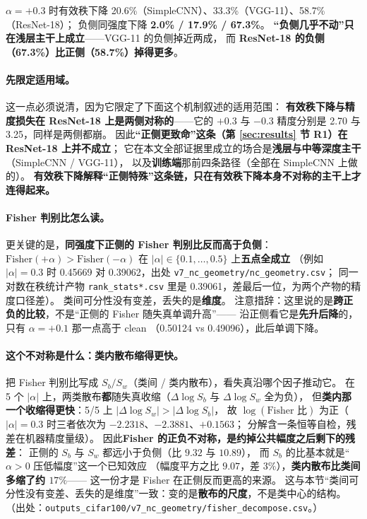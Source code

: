 \documentclass[11pt,a4paper]{ctexart}
\begin{document}
$\alpha=+0.3$ 时有效秩下降 20.6\%（SimpleCNN）、33.3\%（VGG-11）、58.7\%（ResNet-18）；
负侧同强度下降 \textbf{2.0\% / 17.9\% / 67.3\%}。
\textbf{“负侧几乎不动”只在浅层主干上成立}——VGG-11 的负侧掉近两成，
而 \textbf{ResNet-18 的负侧（67.3\%）比正侧（58.7\%）掉得更多}。

\paragraph{先限定适用域。}
这一点必须说清，因为它限定了下面这个机制叙述的适用范围：
\textbf{有效秩下降与精度损失在 ResNet-18 上是两侧对称的}——它的 $+0.3$ 与 $-0.3$ 精度分别是
2.70 与 3.25，同样是两侧都崩。
因此\textbf{“正侧更致命”这条（第 \ref{sec:results} 节 R1）在 ResNet-18 上并不成立}；
它在本文全部证据里成立的场合是\textbf{浅层与中等深度主干}（SimpleCNN / VGG-11），
以及\textbf{训练端}那前四条路径（全部在 SimpleCNN 上做的）。
\textbf{有效秩下降解释“正侧特殊”这条链，只在有效秩下降本身不对称的主干上才连得起来。}

\paragraph{Fisher 判别比怎么读。}
更关键的是，\textbf{同强度下正侧的 Fisher 判别比反而高于负侧}：
$\text{Fisher}(+\alpha)>\text{Fisher}(-\alpha)$ 在 $|\alpha|\in\{0.1,\dots,0.5\}$ 上\textbf{五点全成立}
（例如 $|\alpha|=0.3$ 时 0.45669 对 0.39062，出处 \texttt{v7\_nc\_geometry/nc\_geometry.csv}；
同一对数在秩统计产物 \texttt{rank\_stats*.csv} 里是 0.39061，差最后一位，为两个产物的精度口径差）。
类间可分性没有变差，丢失的是\textbf{维度}。
注意措辞：这里说的是\textbf{跨正负的比较}，不是“正侧的 Fisher 随失真单调升高”——
沿正侧看它是\textbf{先升后降}的，只有 $\alpha=+0.1$ 那一点高于 clean
（0.50124 vs 0.49096），此后单调下降。

\paragraph{这个不对称是什么：类内散布缩得更快。}
把 Fisher 判别比写成 $S_b/S_w$（类间 / 类内散布），看失真沿哪个因子推动它。
在 5 个 $|\alpha|$ 上，两类散布\textbf{都}随失真收缩（$\Delta\log S_b$ 与 $\Delta\log S_w$ 全为负），
但\textbf{类内那一个收缩得更快}：5/5 上 $|\Delta\log S_w|>|\Delta\log S_b|$，
故 $\log(\text{Fisher 比})$ 为正（$|\alpha|=0.3$ 时三者依次为 $-2.2318$、$-2.3881$、$+0.1563$；
分解含一条恒等自检，残差在机器精度量级）。
因此\textbf{Fisher 的正负不对称，是约掉公共幅度之后剩下的残差}：
正侧的 $S_b$ 与 $S_w$ 都远小于负侧（比 $9.32$ 与 $10.89$），
而 $S_b$ 的比基本就是“$\alpha>0$ 压低幅度”这一个已知效应
（幅度平方之比 $9.07$，差 $3\%$），\textbf{类内散布比类间多缩了约 $17\%$}——
这一份才是 Fisher 在正侧反而更高的来源。
这与本节“类间可分性没有变差、丢失的是维度”一致：变的是\textbf{散布的尺度}，不是类中心的结构。
（出处：\texttt{outputs\_cifar100/v7\_nc\_geometry/fisher\_decompose.csv}。）
\end{document}

